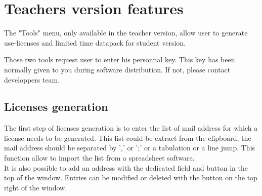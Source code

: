 
\chapter{Teachers version features}

The "Tools" menu, only available in the teacher version, allow user to generate use-licenses and limited time datapack for student version. 

Those two tools request user to enter his personnal key. This key has been normally given to you during software distribution. If not, please contact developpers team.\\

\section{Licenses generation}

The first step of licenses generation is to enter the list of mail address for which a license needs to be generated. This list could be extract from the clipboard, the mail address should be separated by ',' or ';' or a tabulation or a line jump. This function allow to import the list from a spreadsheet software.\\

It is also possible to add an address with the dedicated field and button in the top of the window. Entries can be modified or deleted with the button on the top right of the window.\\

